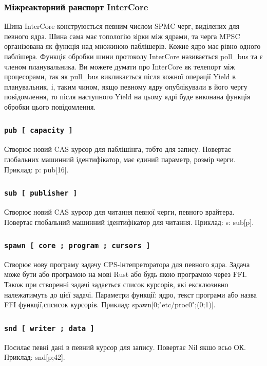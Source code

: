 \begin{definition}
\begin{definition}
\begin{definition}
\begin{definition}
\newpage
\subsubsection{Міжреакторний ранспорт InterCore}

Шина InterCore конструюється певним числом SPMC черг, виділених для певного ядра.
Шина сама має топологію зірки між ядрами, та черга MPSC організована
як функція над множиною паблішерів. Кожне ядро має рівно одного паблішера.
Функція обробки шини протоколу InterCore називається poll\_bus та є членом планувальника.
Ви можете думати про InterCore як телепорт між процесорами, так як pull\_bus
викликається після кожної операції Yield в планувальник, і, таким чином,
якщо певному ядру опублікували в його чергу повідомлення, то після наступного Yield
на цьому ядрі буде виконана функція обробки цього повідомлення.

\subsubsection*{\lstinline{pub [ capacity ]}}
Створює новий CAS курсор для паблішінга, тобто для запису.
Повертає глобальних машинний ідентифікатор, має єдиний параметр, розмір черги.
Приклад: p: pub[16].

\subsubsection*{\lstinline{sub [ publisher ]}}
Створює новий CAS курсор для читання певної черги, певного врайтера.
Повертає глобальний машинний ідентифікатор для читання.
Приклад: s: sub[p].

\subsubsection*{\lstinline{spawn [ core ; program ; cursors ]}}
Створює нову програму задачу CPS-інтепреторатора для певного ядра.
Задача може бути або програмою на мові Rust або будь якою програмою через FFI.
Також при створенні задачі задається список курсорів,
які ексклюзивно належатимуть до цієї задачі.
Параметри функції: ядро, текст програми або назва FFI функції,спсисок курсорів.
Приклад: spawn[0;"etc/proc0";(0;1)].

\subsubsection*{\lstinline{snd [ writer ; data ]}}
Посилає певні дані в певний курсор для запису. Повертає Nil якшо всьо ОК.
Приклад: snd[p;42].


\end{definition}
\end{definition}
\end{definition}
\end{definition}
